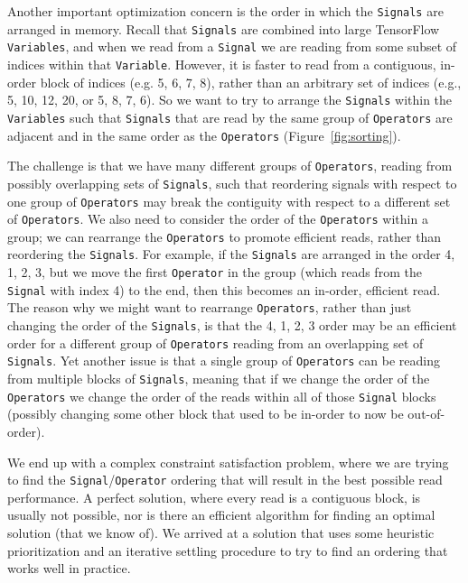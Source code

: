 \documentclass{article}
\begin{document}
Another important optimization concern is the order in which the \texttt{Signals} are arranged in memory.  Recall that \texttt{Signals} are combined into large TensorFlow \texttt{Variables}, and when we read from a \texttt{Signal} we are reading from some subset of indices within that \texttt{Variable}.  However, it is faster to read from a contiguous, in-order block of indices (e.g. 5, 6, 7, 8), rather than an arbitrary set of indices (e.g., 5, 10, 12, 20, or 5, 8, 7, 6).  So we want to try to arrange the \texttt{Signals} within the \texttt{Variables} such that \texttt{Signals} that are read by the same group of \texttt{Operators} are adjacent and in the same order as the \texttt{Operators} (Figure~\ref{fig:sorting}).

The challenge is that we have many different groups of \texttt{Operators}, reading from possibly overlapping sets of \texttt{Signals}, such that reordering signals with respect to one group of \texttt{Operators} may break the contiguity with respect to a different set of \texttt{Operators}.  We also need to consider the order of the \texttt{Operators} within a group; we can rearrange the \texttt{Operators} to promote efficient reads, rather than reordering the \texttt{Signals}.  For example, if the \texttt{Signals} are arranged in the order 4, 1, 2, 3, but we move the first \texttt{Operator} in the group (which reads from the \texttt{Signal} with index 4) to the end, then this becomes an in-order, efficient read.  The reason why we might want to rearrange \texttt{Operators}, rather than just changing the order of the \texttt{Signals}, is that the 4, 1, 2, 3 order may be an efficient order for a different group of \texttt{Operators} reading from an overlapping set of \texttt{Signals}.  Yet another issue is that a single group of \texttt{Operators} can be reading from multiple blocks of \texttt{Signals}, meaning that if we change the order of the \texttt{Operators} we change the order of the reads within all of those \texttt{Signal} blocks (possibly changing some other block that used to be in-order to now be out-of-order).

We end up with a complex constraint satisfaction problem, where we are trying to find the \texttt{Signal}/\texttt{Operator} ordering that will result in the best possible read performance. A perfect solution, where every read is a contiguous block, is usually not possible, nor is there an efficient algorithm for finding an optimal solution (that we know of).  We arrived at a solution that uses some heuristic prioritization and an iterative settling procedure to try to find an ordering that works well in practice.  
\end{document}

